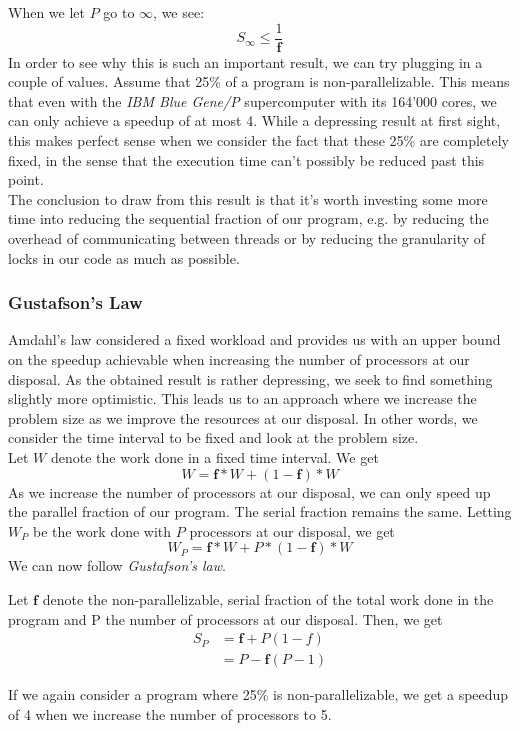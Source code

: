 \documentclass[main.tex]{subfiles}
\begin{document}
When we let $P$ go to $\infty$, we see:
\begin{equation*}
    S_\infty \leq \frac{1}{\mathbf{f}}
\end{equation*}
In order to see why this is such an important result, we can try plugging in a couple of values. Assume that 25\% of a program is non-parallelizable. This means that even with the \textit{IBM Blue Gene/P} supercomputer with its 164'000 cores, we can only achieve a speedup of at most 4. While a depressing result at first sight, this makes perfect sense when we consider the fact that these 25\% are completely fixed, in the sense that the execution time can't possibly be reduced past this point.\\[0.3cm]
The conclusion to draw from this result is that it's worth investing some more time into reducing the sequential fraction of our program, e.g. by reducing the overhead of communicating between threads or by reducing the granularity of locks in our code as much as possible.


\subsubsection{Gustafson's Law} \label{Gustafson's Law}
Amdahl's law considered a fixed workload and provides us with an upper bound on the speedup achievable when increasing the number of processors at our disposal. As the obtained result is rather depressing, we seek to find something slightly more optimistic. This leads us to an approach where we increase the problem size as we improve the resources at our disposal. In other words, we consider the time interval to be fixed and look at the problem size.\\
Let $W$ denote the work done in a fixed time interval. We get
\begin{equation*}
    W = \mathbf{f} * W + (1 - \mathbf{f}) * W
\end{equation*}
As we increase the number of processors at our disposal, we can only speed up the parallel fraction of our program. The serial fraction remains the same. Letting $W_P$ be the work done with $P$ processors at our disposal, we get
\begin{equation*}
    W_P = \mathbf{f} * W + P * (1 - \mathbf{f}) * W
\end{equation*}
We can now follow \textit{Gustafson's law}.
\begin{theorem}
    Let $\mathbf{f}$ denote the non-parallelizable, serial fraction of the total work done in the program and P the number of processors at our disposal. Then, we get
    \begin{align*}
        S_P &= \mathbf{f} + P(1-f)\\
            &= P - \mathbf{f}(P-1)
    \end{align*}
\end{theorem}
If we again consider a program where 25\% is non-parallelizable, we get a speedup of 4 when we increase the number of processors to 5.
\end{document}
